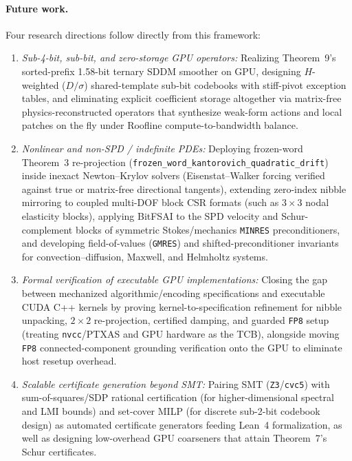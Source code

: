 \documentclass[10pt]{article}
\begin{document}
\paragraph{Future work.} Four research directions follow directly from this framework:
\begin{enumerate}
  \item \emph{Sub-4-bit, sub-bit, and zero-storage GPU operators:} Realizing Theorem~9's sorted-prefix 1.58-bit ternary SDDM smoother on GPU, designing $H$-weighted ($D/\sigma$) shared-template sub-bit codebooks with stiff-pivot exception tables, and eliminating explicit coefficient storage altogether via matrix-free physics-reconstructed operators that synthesize weak-form actions and local patches on the fly under Roofline compute-to-bandwidth balance.
  \item \emph{Nonlinear and non-SPD / indefinite PDEs:} Deploying frozen-word Theorem~3 re-projection (\texttt{frozen\_word\_kantorovich\_quadratic\_drift}) inside inexact Newton--Krylov solvers (Eisenstat--Walker forcing verified against true or matrix-free directional tangents), extending zero-index nibble mirroring to coupled multi-DOF block CSR formats (such as $3\times 3$ nodal elasticity blocks), applying BitFSAI to the SPD velocity and Schur-complement blocks of symmetric Stokes/mechanics \texttt{MINRES} preconditioners, and developing field-of-values (\texttt{GMRES}) and shifted-preconditioner invariants for convection--diffusion, Maxwell, and Helmholtz systems.
  \item \emph{Formal verification of executable GPU implementations:} Closing the gap between mechanized algorithmic/encoding specifications and executable CUDA C++ kernels by proving kernel-to-specification refinement for nibble unpacking, $2\times 2$ re-projection, certified damping, and guarded \texttt{FP8} setup (treating \texttt{nvcc}/PTXAS and GPU hardware as the TCB), alongside moving \texttt{FP8} connected-component grounding verification onto the GPU to eliminate host resetup overhead.
  \item \emph{Scalable certificate generation beyond SMT:} Pairing SMT (\texttt{Z3}/\texttt{cvc5}) with sum-of-squares/SDP rational certification (for higher-dimensional spectral and LMI bounds) and set-cover MILP (for discrete sub-2-bit codebook design) as automated certificate generators feeding Lean~4 formalization, as well as designing low-overhead GPU coarseners that attain Theorem~7's Schur certificates.
\end{enumerate}
\end{document}
